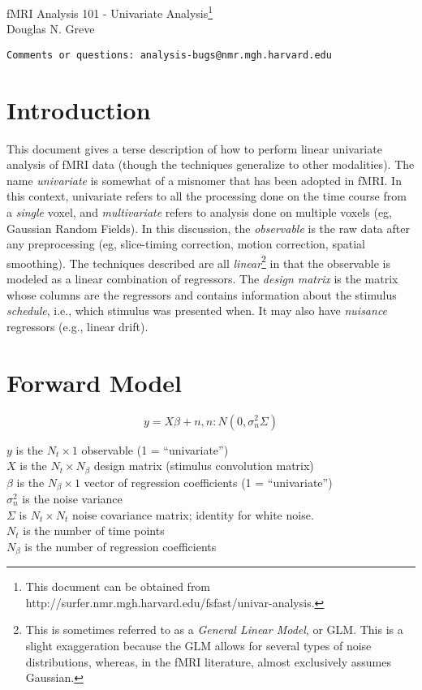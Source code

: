 \documentclass{article}
\begin{document}
\begin{LARGE}
\begin{center}
fMRI Analysis 101 - Univariate Analysis\footnote{This document can be
obtained from http://surfer.nmr.mgh.harvard.edu/fsfast/univar-analysis.}\\
Douglas N. Greve\\
\end{center}
\end{LARGE}
\begin{verbatim}
Comments or questions: analysis-bugs@nmr.mgh.harvard.edu
\end{verbatim}

\section{Introduction}

This document gives a terse description of how to perform linear
univariate analysis of fMRI data (though the techniques generalize to
other modalities). The name {\em univariate} is somewhat of a misnomer
that has been adopted in fMRI.  In this context, univariate refers to
all the processing done on the time course from a {\em single} voxel,
and {\em multivariate} refers to analysis done on multiple voxels (eg,
Gaussian Random Fields). In this discussion, the {\em observable} is
the raw data after any preprocessing (eg, slice-timing correction,
motion correction, spatial smoothing). The techniques described are
all {\em linear}\footnote{This is sometimes referred to as a {\em
General Linear Model}, or GLM. This is a slight exaggeration because
the GLM allows for several types of noise distributions, whereas, in
the fMRI literature, almost exclusively assumes Gaussian.} in that the
observable is modeled as a linear combination of regressors. The {\em
design matrix} is the matrix whose columns are the regressors and
contains information about the stimulus {\em schedule}, i.e., which
stimulus was presented when. It may also have {\em nuisance}
regressors (e.g., linear drift).

\section{Forward Model}

\begin{equation}
y = X \beta + n, n: N(0,\sigma_n^2 \Sigma)
\end{equation}

\noindent
$y$ is the $N_t \times 1$ observable (1 = ``univariate'')\\
$X$ is the $N_t \times N_\beta$ design matrix (stimulus convolution matrix) \\
$\beta$ is the $N_\beta \times 1$ vector of regression coefficients (1 = ``univariate'')\\
$\sigma_n^2$ is the noise variance \\
$\Sigma$ is $N_t \times N_t$ noise covariance matrix; identity for
white noise.\\
$N_t$ is the number of time points\\
$N_\beta$ is the number of regression coefficients\\
\end{document}
